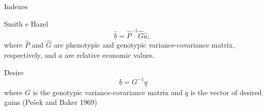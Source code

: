 \documentclass[
  ignorenonframetext,
  aspectratio=169,
]{beamer}
\begin{document}
\begin{frame}{Indexes}
\label{indexes-1}
\begin{block}{Smith e Hazel}
\label{smith-e-hazel}
\[
\hat{\underline{b}} = \hat{P}^{-1} \hat{G} \hat{a};\;
\] where \(\hat{P}\) and \(\hat{G}\) are phenotypic and genotypic
variance-covariance matrix, respectively, and \(\hat{a}\) are relative
economic values.
\end{block}

\begin{block}{Desire}
\label{desire}
\[
\underline{b} = G^{-1} \underline{q}
\] where \(G\) is the genotypic variance-covariance matrix and \(q\) is
the vector of desired gains (Pešek and Baker 1969)
\end{block}
\end{frame}
\end{document}
